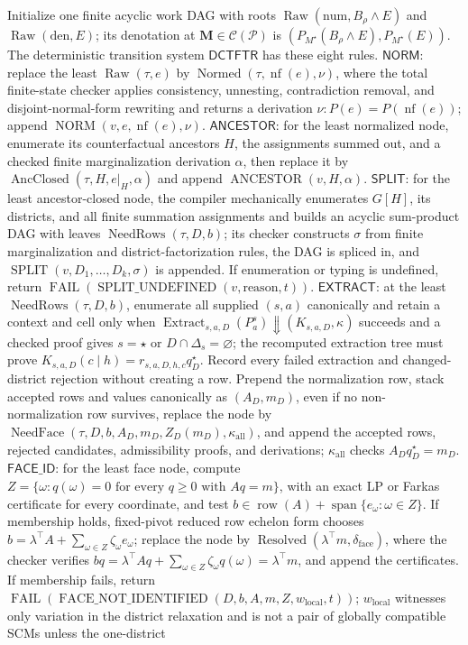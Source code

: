 Initialize one finite acyclic work DAG with roots \(\operatorname{Raw}(\mathrm{num},B_\rho\wedge E)\) and \(\operatorname{Raw}(\mathrm{den},E)\); its denotation at \(\mathbf M\in\mathcal C(\mathcal P)\) is \((P_{M^\star}(B_\rho\wedge E),P_{M^\star}(E))\). The deterministic transition system \(\mathsf{DCTFTR}\) has these eight rules. \(\mathsf{NORM}\): replace the least \(\operatorname{Raw}(\tau,e)\) by \(\operatorname{Normed}(\tau,\operatorname{nf}(e),\nu)\), where the total finite-state checker applies consistency, unnesting, contradiction removal, and disjoint-normal-form rewriting and returns a derivation \(\nu:P(e)=P(\operatorname{nf}(e))\); append \(\operatorname{NORM}(v,e,\operatorname{nf}(e),\nu)\). \(\mathsf{ANCESTOR}\): for the least normalized node, enumerate its counterfactual ancestors \(H\), the assignments summed out, and a checked finite marginalization derivation \(\alpha\), then replace it by \(\operatorname{AncClosed}(\tau,H,e|_H,\alpha)\) and append \(\operatorname{ANCESTOR}(v,H,\alpha)\). \(\mathsf{SPLIT}\): for the least ancestor-closed node, the compiler mechanically enumerates \(G[H]\), its districts, and all finite summation assignments and builds an acyclic sum-product DAG with leaves \(\operatorname{NeedRows}(\tau,D,b)\); its checker constructs \(\sigma\) from finite marginalization and district-factorization rules, the DAG is spliced in, and \(\operatorname{SPLIT}(v,D_1,\ldots,D_k,\sigma)\) is appended. If enumeration or typing is undefined, return \(\operatorname{FAIL}(\operatorname{SPLIT\_UNDEFINED}(v,\mathrm{reason},t))\). \(\mathsf{EXTRACT}\): at the least \(\operatorname{NeedRows}(\tau,D,b)\), enumerate all supplied \((s,a)\) canonically and retain a context and cell only when \(\operatorname{Extract}_{s,a,D}(P_a^s)\Downarrow(K_{s,a,D},\kappa)\) succeeds and a checked proof gives \(s=\star\) or \(D\cap\Delta_s=\varnothing\); the recomputed extraction tree must prove \(K_{s,a,D}(c\mid h)=r_{s,a,D,h,c}q_D^\star\). Record every failed extraction and changed-district rejection without creating a row. Prepend the normalization row, stack accepted rows and values canonically as \((A_D,m_D)\), even if no non-normalization row survives, replace the node by \(\operatorname{NeedFace}(\tau,D,b,A_D,m_D,Z_D(m_D),\kappa_{\mathrm{all}})\), and append the accepted rows, rejected candidates, admissibility proofs, and derivations; \(\kappa_{\mathrm{all}}\) checks \(A_Dq_D^\star=m_D\). \(\mathsf{FACE\_ID}\): for the least face node, compute \(Z=\{\omega:q(\omega)=0\text{ for every }q\ge0\text{ with }Aq=m\}\), with an exact LP or Farkas certificate for every coordinate, and test \(b\in\operatorname{row}(A)+\operatorname{span}\{e_\omega:\omega\in Z\}\). If membership holds, fixed-pivot reduced row echelon form chooses \(b=\lambda^\top A+\sum_{\omega\in Z}\zeta_\omega e_\omega\); replace the node by \(\operatorname{Resolved}(\lambda^\top m,\delta_{\mathrm{face}})\), where the checker verifies \(bq=\lambda^\top Aq+\sum_{\omega\in Z}\zeta_\omega q(\omega)=\lambda^\top m\), and append the certificates. If membership fails, return \(\operatorname{FAIL}(\operatorname{FACE\_NOT\_IDENTIFIED}(D,b,A,m,Z,w_{\mathrm{local}},t))\); \(w_{\mathrm{local}}\) witnesses only variation in the district relaxation and is not a pair of globally compatible SCMs unless the one-district 